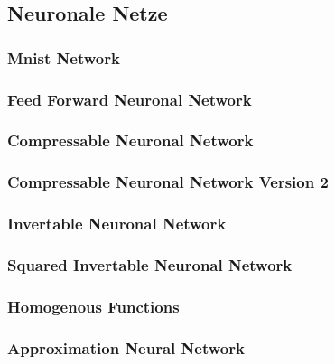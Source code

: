 \documentclass[Interploate_hadwritten_Digits.tex]{subfiles}
\begin{document}
	\subsection{Neuronale Netze}
	\subsubsection{Mnist Network}
	
	\subsubsection{Feed Forward Neuronal Network}
	
	\subsubsection{Compressable Neuronal Network}
	
	\subsubsection{Compressable Neuronal Network Version 2}
	
	\subsubsection{Invertable Neuronal Network}
	
	\subsubsection{Squared Invertable Neuronal Network}
	
	\subsubsection{Homogenous Functions}
	
	\subsubsection{Approximation Neural Network}
	
	
\end{document}
